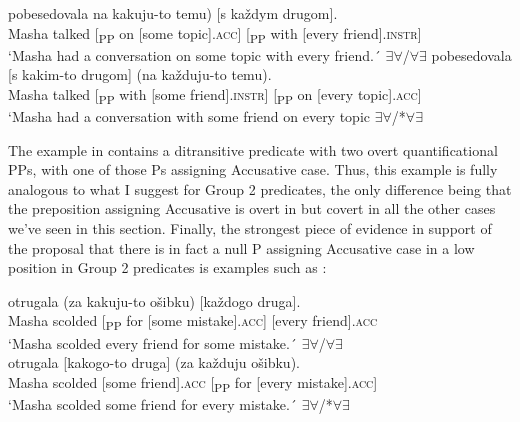 \documentclass[output=paper,colorlinks,citecolor=brown,nonflat]{./langscibook}
\begin{document}
\ea%
    \label{ex:antonyuk:53}
    \ea \label{ex:antonyuk:53a}
      {pobesedovala} {} {na} {kakuju-to} {temu)}         {}    [s       {každym} {drugom]}.\\
    Masha talked     [\textsubscript{PP}  on [some      topic].\textsc{acc}] [\textsubscript{PP} with [every friend].\textsc{instr}]\\
    \glt `Masha had a conversation on some topic with every friend.´ \hfill ${\exists}{\forall}$/${\forall}{\exists}$
    \ex \label{ex:antonyuk:53b}
      {pobesedovala} {} {[s}       {kakim-to} {drugom]} {}           {(na} {každuju-to} {temu)}.\\
    Masha talked         [\textsubscript{PP} with [some      friend].\textsc{instr}] [\textsubscript{PP} on [every topic].\textsc{acc}]\\
    \glt `Masha had a conversation with some friend on every topic \hfill ${\exists}{\forall}$/*${\forall}{\exists}$
    \z
\z

The example in  contains a ditransitive predicate with two overt quantificational PPs, with one of those Ps assigning Accusative case. Thus, this example is fully analogous to what I suggest for Group 2 predicates, the only difference being that the preposition assigning Accusative is overt in  but covert in all the other cases we’ve seen in this section. Finally, the strongest piece of evidence in support of the proposal that there is in fact a null P assigning Accusative case in a low position in Group 2 predicates is examples such as :

\ea%
    \label{ex:antonyuk:54}
    \ea \label{ex:antonyuk:54a}
       {otrugala}  {}  {(za}  {kakuju-to} {ošibku)}          {[každogo} {druga]}.\\
    Masha scolded [\textsubscript{PP} for [some       mistake].\textsc{acc}] [every    friend].\textsc{acc~}\\
    \glt `Masha scolded every friend for some mistake.´ \hfill ${\exists}{\forall}$/${\forall}{\exists}$\\
    \ex \label{ex:antonyuk:54b}
       {otrugala} {[kakogo-to} {druga]}    {}        {(za}  {každuju}  {ošibku)}.\\
    Masha scolded  [some         friend].\textsc{acc} [\textsubscript{PP} for [every     mistake].\textsc{acc}]\\
    \glt `Masha scolded some friend for every mistake.´ \hfill ${\exists}{\forall}$/*${\forall}{\exists}$
    \z
\z
\end{document}

